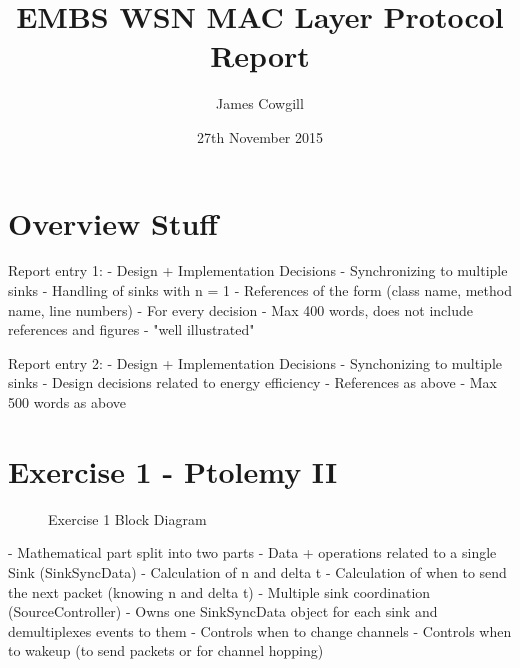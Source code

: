 \documentclass[a4paper,12pt,draft,DIV=calc]{scrartcl}
\begin{document}
\title{EMBS WSN MAC Layer Protocol Report}
\author{James Cowgill}
\date{27th November 2015}
\maketitle

\section{Overview Stuff}
Report entry 1:
 - Design + Implementation Decisions
   - Synchronizing to multiple sinks
   - Handling of sinks with n = 1
 - References of the form (class name, method name, line numbers)
   - For every decision
 - Max 400 words, does not include references and figures
 - "well illustrated"

Report entry 2:
 - Design + Implementation Decisions
   - Synchonizing to multiple sinks
   - Design decisions related to energy efficiency
 - References as above
 - Max 500 words as above

\section{Exercise 1 - Ptolemy II}
\begin{figure}[ht]
  \centering
  \caption{Exercise 1 Block Diagram}
\end{figure}
- Mathematical part split into two parts
  - Data + operations related to a single Sink (SinkSyncData)
    - Calculation of n and delta t
    - Calculation of when to send the next packet (knowing n and delta t)
  - Multiple sink coordination (SourceController)
    - Owns one SinkSyncData object for each sink and demultiplexes events to
      them
    - Controls when to change channels
    - Controls when to wakeup (to send packets or for channel hopping)
\end{document}

